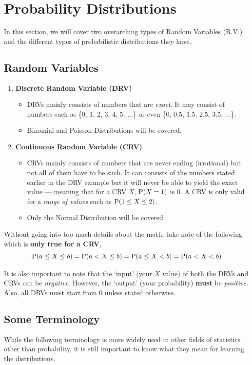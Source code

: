 \documentclass[../setup.tex]{subfiles}
\begin{document}
\section{Probability Distributions}
In this section, we will cover two overarching types of Random Variables (R.V.) and the different types of probabilistic distributions they have.
\subsection{Random Variables}
\begin{enumerate}
	\item \textbf{Discrete Random Variable (DRV)} \begin{itemize} \item DRVs mainly consists of numbers that are \emph{exact}. It may consist of numbers such as \{0, 1, 2, 3, 4, 5, ...\} or even \{0, 0.5, 1.5, 2.5, 3.5, ...\}. \item Binomial and Poisson Distributions will be covered. \end{itemize}
	\item \textbf{Continuous Random Variable (CRV)} \begin{itemize} \item CRVs mainly consists of numbers that are never ending (irrational) but not all of them have to be such. It can consists of the numbers stated earlier in the DRV example but it will never be able to yield the exact value --- meaning that for a CRV $X$, $\textup{P}(X=1)$ is 0. A CRV is only valid for a \emph{range of values} such as $\textup{P}(1 \leq X \leq 2)$.  \item Only the Normal Distribution will be covered. \end{itemize}
\end{enumerate}
\begin{remark} Without going into too much details about the math, take note of the following which is \textbf{only true for a CRV},
\[ \textup{P}(a \leq X \leq b) = \textup{P}(a < X \leq b) = \textup{P}(a \leq X < b) = \textup{P}(a < X < b) \] \end{remark}
\begin{remark} It is also important to note that the `input' (your $X$ value) of both the DRVs and CRVs  can be \textit{negative}. However, the `output' (your probability) \textbf{must} be \textit{positive}. Also, all DRVs must start from 0 unless stated otherwise. \end{remark}

\subsection{Some Terminology}
While the following terminology is more widely used in other fields of statistics other than probability, it is still important to know what they mean for learning the distributions.
\end{document}
